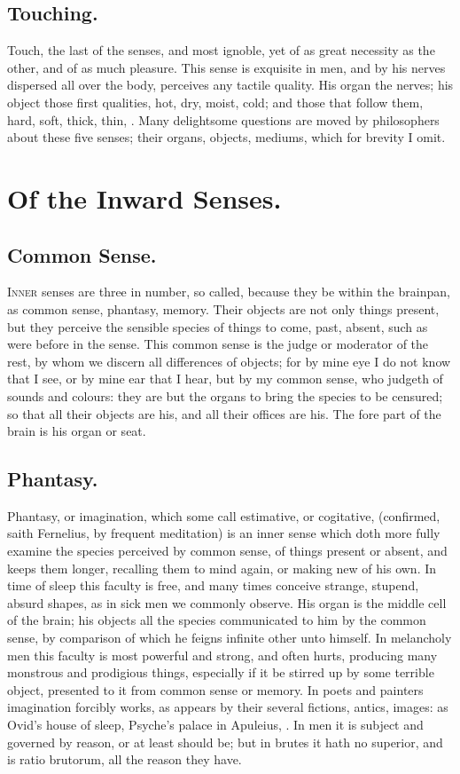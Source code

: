 {\subsection{Touching.}
Touch, the last of the senses, and most ignoble, yet of as
great necessity as the other, and of as much pleasure. This sense is
exquisite in men, and by his nerves dispersed all over the body,
perceives any tactile quality. His organ the nerves; his object those
first qualities, hot, dry, moist, cold; and those that follow them,
hard, soft, thick, thin, \etc{}. Many delightsome questions are moved by
philosophers about these five senses; their organs, objects, mediums,
which for brevity I omit.

\section{Of the Inward Senses.}

\subsection{Common Sense.}
\lettrine{I}{nner} senses are three in number, so called, because
they be within the brainpan, as common sense, phantasy, memory. Their
objects are not only things present, but they perceive the sensible
species of things to come, past, absent, such as were before in the
sense. This common sense is the judge or moderator of the rest, by whom
we discern all differences of objects; for by mine eye I do not know
that I see, or by mine ear that I hear, but by my common sense, who
judgeth of sounds and colours: they are but the organs to bring the
species to be censured; so that all their objects are his, and all
their offices are his. The fore part of the brain is his organ or seat.
\subsection{Phantasy.}
Phantasy, or imagination, which some call estimative, or
cogitative, (confirmed, saith Fernelius, by frequent meditation)
is an inner sense which doth more fully examine the species perceived
by common sense, of things present or absent, and keeps them longer,
recalling them to mind again, or making new of his own. In time of
sleep this faculty is free, and many times conceive strange, stupend,
absurd shapes, as in sick men we commonly observe. His organ is the
middle cell of the brain; his objects all the species communicated to
him by the common sense, by comparison of which he feigns infinite
other unto himself. In melancholy men this faculty is most powerful and
strong, and often hurts, producing many monstrous and prodigious
things, especially if it be stirred up by some terrible object,
presented to it from common sense or memory. In poets and painters
imagination forcibly works, as appears by their several fictions,
antics, images: as Ovid's house of sleep, Psyche's palace in Apuleius,
\etc{}. In men it is subject and governed by reason, or at least should be;
but in brutes it hath no superior, and is ratio brutorum, all the
reason they have.
}
